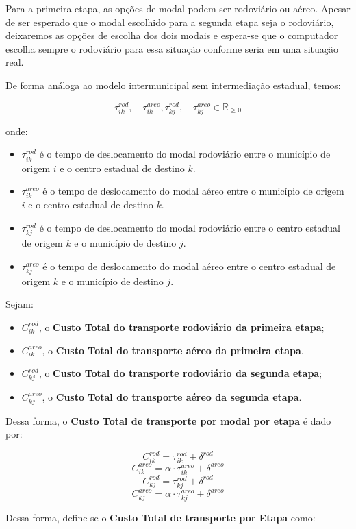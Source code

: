 Para a primeira etapa, as opções de modal podem ser rodoviário ou aéreo. Apesar de ser esperado que o modal escolhido para a segunda etapa seja o rodoviário, deixaremos as opções de escolha dos dois modais e espera-se que o computador escolha sempre o rodoviário para essa situação conforme seria em uma situação real.

De forma análoga ao modelo intermunicipal sem intermediação estadual, temos:

\[
\tau_{ik}^{rod}, \quad \tau_{ik}^{areo}, \tau_{kj}^{rod}, \quad \tau_{kj}^{areo} \in \mathbb{R}_{\geq 0}
\]

onde:
\begin{itemize}
    \item $\tau_{ik}^{rod}$ é o tempo de deslocamento do modal rodoviário entre o município de origem $i$ e o centro estadual de destino $k$.
    \item $\tau_{ik}^{areo}$ é o tempo de deslocamento do modal aéreo entre o município de origem $i$ e o centro estadual de destino $k$.
    \item $\tau_{kj}^{rod}$ é o tempo de deslocamento do modal rodoviário entre o centro estadual de origem $k$ e o município de destino $j$.
    \item $\tau_{kj}^{areo}$ é o tempo de deslocamento do modal aéreo entre o centro estadual de origem $k$ e o município de destino $j$.
\end{itemize}

Sejam:
\begin{itemize}
    \item $C_{ik}^{rod}$, o \textbf{Custo Total do transporte rodoviário da primeira etapa};
    \item $C_{ik}^{areo}$, o \textbf{Custo Total do transporte aéreo  da primeira etapa}.
    \item $C_{kj}^{rod}$, o \textbf{Custo Total do transporte rodoviário da segunda etapa};
    \item $C_{kj}^{areo}$, o \textbf{Custo Total do transporte aéreo  da segunda etapa}.
\end{itemize}


Dessa forma, o \textbf{Custo Total de transporte por modal por etapa} é dado por:

\[
C_{ik}^{rod} = \tau_{ik}^{rod} + \delta^{rod}
\]
\[
C_{ik}^{areo} = \alpha \cdot \tau_{ik}^{areo} + \delta^{areo}
\]
\[
C_{kj}^{rod} = \tau_{kj}^{rod} + \delta^{rod}
\]
\[
C_{kj}^{areo} = \alpha \cdot \tau_{kj}^{areo} + \delta^{areo}
\]


Dessa forma, define-se o \textbf{Custo Total de transporte por Etapa} como:

